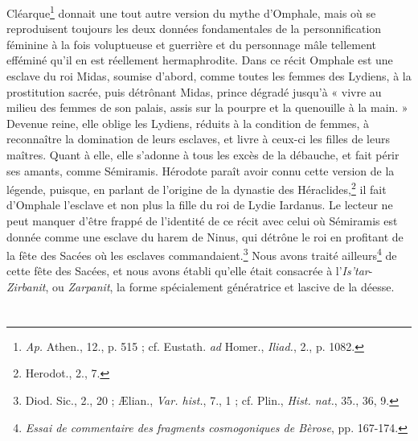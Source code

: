 \documentclass[a4paper, 11pt, oneside, landscape]{article}
\begin{document}
Cléarque\footnote{\emph{Ap.} Athen., 12., p. 515 ; cf. Eustath. \emph{ad} Homer., \emph{Iliad.}, 2., p. 1082.} donnait une tout autre version du mythe d'Omphale, mais où se reproduisent toujours les deux données fondamentales de la personnification féminine à la fois voluptueuse et guerrière et du personnage mâle tellement efféminé qu'il en est réellement hermaphrodite. Dans ce récit Omphale est une esclave du roi Midas, soumise d'abord, comme toutes les femmes des Lydiens, à la prostitution sacrée, puis détrônant Midas, prince dégradé jusqu'à « vivre au milieu des femmes de son palais, assis sur la pourpre et la quenouille à la main. » Devenue reine, elle oblige les Lydiens, réduits à la condition de femmes, à reconnaître la domination de leurs esclaves, et livre à ceux-ci les filles de leurs maîtres. Quant à elle, elle s'adonne à tous les excès de la débauche, et fait périr ses amants, comme Sémiramis. Hérodote paraît avoir connu cette version de la légende, puisque, en parlant de l'origine de la dynastie des Héraclides,\footnote{Herodot., 2., 7.} il fait d'Omphale l'esclave et non plus la fille du roi de Lydie Iardanus. Le lecteur ne peut manquer d'être frappé de l'identité de ce récit avec celui où Sémiramis est donnée comme une esclave du harem de Ninus, qui détrône le roi en profitant de la fête des Sacées où les esclaves commandaient.\footnote{Diod. Sic., 2., 20 ; Ælian., \emph{Var. hist.}, 7., 1 ; cf. Plin., \emph{Hist. nat.}, 35., 36, 9.} Nous avons traité ailleurs\footnote{\emph{Essai de commentaire des fragments cosmogoniques de Bèrose}, pp. 167-174.} de cette fête des Sacées, et nous avons établi qu'elle était consacrée à l'\emph{Is'tar}-\emph{Zirbanit}, ou \emph{Zarpanit}, la forme spécialement génératrice et lascive de la déesse.

\bigskip \centerline{\EightStarTaper} \centerline{\EightStarTaper\EightStarTaper} \bigskip\clearpage
\section{}
\end{document}
